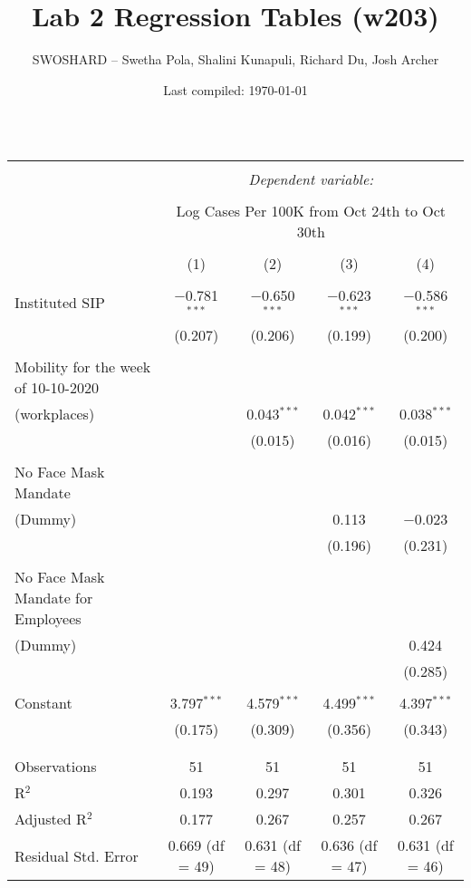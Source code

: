 \documentclass[14pt]{extarticle}
\title{Lab 2 Regression Tables (w203)}
\author{SWOSHARD -- Swetha Pola, Shalini Kunapuli, Richard Du, Josh Archer}
\date{Last compiled: \today}
\begin{document}
\begin{landscape}




\begin{table}[!htbp] \centering 
  \caption{} 
  \label{} 
\begin{tabular}{@{\extracolsep{5pt}}lcccc} 
\\[-1.8ex]\hline 
\hline \\[-1.8ex] 
 & \multicolumn{4}{c}{\textit{Dependent variable:}} \\ 
\cline{2-5} 
\\[-1.8ex] & \multicolumn{4}{c}{Log Cases Per 100K from Oct 24th to Oct 30th} \\ 
\\[-1.8ex] & (1) & (2) & (3) & (4)\\ 
\hline \\[-1.8ex] 
 Instituted SIP & $-$0.781$^{***}$ & $-$0.650$^{***}$ & $-$0.623$^{***}$ & $-$0.586$^{***}$ \\ 
  & (0.207) & (0.206) & (0.199) & (0.200) \\ 
  & & & & \\ 
 Mobility for the week of 10-10-2020\\ (workplaces) &  & 0.043$^{***}$ & 0.042$^{***}$ & 0.038$^{***}$ \\ 
  &  & (0.015) & (0.016) & (0.015) \\ 
  & & & & \\ 
 No Face Mask Mandate \\ (Dummy) &  &  & 0.113 & $-$0.023 \\ 
  &  &  & (0.196) & (0.231) \\ 
  & & & & \\ 
 No Face Mask Mandate for Employees \\ (Dummy) &  &  &  & 0.424 \\ 
  &  &  &  & (0.285) \\ 
  & & & & \\ 
 Constant & 3.797$^{***}$ & 4.579$^{***}$ & 4.499$^{***}$ & 4.397$^{***}$ \\ 
  & (0.175) & (0.309) & (0.356) & (0.343) \\ 
  & & & & \\ 
\hline \\[-1.8ex] 
Observations & 51 & 51 & 51 & 51 \\ 
R$^{2}$ & 0.193 & 0.297 & 0.301 & 0.326 \\ 
Adjusted R$^{2}$ & 0.177 & 0.267 & 0.257 & 0.267 \\ 
Residual Std. Error & 0.669 (df = 49) & 0.631 (df = 48) & 0.636 (df = 47) & 0.631 (df = 46) \\ 

\end{tabular}
\end{table}
\end{landscape}
\end{document}

